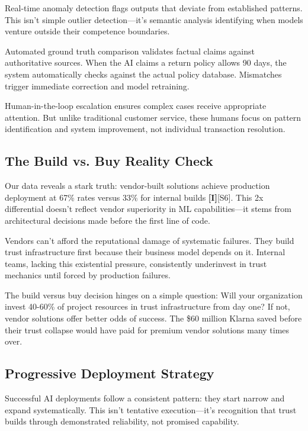 \documentclass[a4paper,11pt]{article}
\newcommand{\ilabel}{\textbf{\textcolor{icolor}{[I]}}}
\begin{document}
Real-time anomaly detection flags outputs that deviate from established patterns. This isn't simple outlier detection—it's semantic analysis identifying when models venture outside their competence boundaries.


Automated ground truth comparison validates factual claims against authoritative sources. When the AI claims a return policy allows 90 days, the system automatically checks against the actual policy database. Mismatches trigger immediate correction and model retraining.


Human-in-the-loop escalation ensures complex cases receive appropriate attention. But unlike traditional customer service, these humans focus on pattern identification and system improvement, not individual transaction resolution.


\subsection{The Build vs. Buy Reality Check}

Our data reveals a stark truth: vendor-built solutions achieve production deployment at 67\% rates versus 33\% for internal builds \ilabel{}\textcolor{primary}{[S6]}. This 2x differential doesn't reflect vendor superiority in ML capabilities—it stems from architectural decisions made before the first line of code.


Vendors can't afford the reputational damage of systematic failures. They build trust infrastructure first because their business model depends on it. Internal teams, lacking this existential pressure, consistently underinvest in trust mechanics until forced by production failures.


\begin{decisionbox}
The build versus buy decision hinges on a simple question: Will your organization invest 40-60\% of project resources in trust infrastructure from day one? If not, vendor solutions offer better odds of success. The \$60 million Klarna saved before their trust collapse would have paid for premium vendor solutions many times over.
\end{decisionbox}


\subsection{Progressive Deployment Strategy}

Successful AI deployments follow a consistent pattern: they start narrow and expand systematically. This isn't tentative execution—it's recognition that trust builds through demonstrated reliability, not promised capability.
\end{document}
